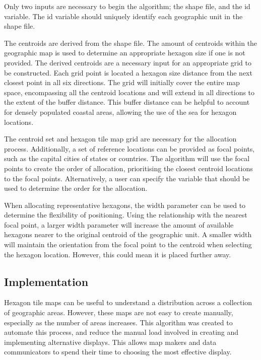 Only two inputs are necessary to begin the algorithm; the shape file,
and the id variable. The id variable should uniquely identify each
geographic unit in the shape file.

The centroids are derived from the shape file. The amount of centroids
within the geographic map is used to determine an appropriate hexagon
size if one is not provided. The derived centroids are a necessary input
for an appropriate grid to be constructed. Each grid point is located a
hexagon size distance from the next closest point in all six directions.
The grid will initially cover the entire map space, encompassing all the
centroid locations and will extend in all directions to the extent of
the buffer distance. This buffer distance can be helpful to account for
densely populated coastal areas, allowing the use of the sea for hexagon
locations.

The centroid set and hexagon tile map grid are necessary for the
allocation process. Additionally, a set of reference locations can be
provided as focal points, such as the capital cities of states or
countries. The algorithm will use the focal points to create the order
of allocation, prioritising the closest centroid locations to the focal
points. Alternatively, a user can specify the variable that should be
used to determine the order for the allocation.

When allocating representative hexagons, the width parameter can be used
to determine the flexibility of positioning. Using the relationship with
the nearest focal point, a larger width parameter will increase the
amount of available hexagons nearer to the original centroid of the
geographic unit. A smaller width will maintain the orientation from the
focal point to the centroid when selecting the hexagon location.
However, this could mean it is placed further away.

\hypertarget{implementation}{%
\subsection{Implementation}\label{implementation}}

Hexagon tile maps can be useful to understand a distribution across a
collection of geographic areas. However, these maps are not easy to
create manually, especially as the number of areas increases. This
algorithm was created to automate this process, and reduce the manual
load involved in creating and implementing alternative displays. This
allows map makers and data communicators to spend their time to choosing
the most effective display.

